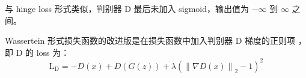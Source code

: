 与 hinge loss 形式类似，判别器 D 最后未加入 sigmoid，输出值为 $-\infty$ 到 $\infty$ 之间。

Wassertein 形式损失函数的改进版是在损失函数中加入判别器 D 梯度的正则项 ，
即 D 的 loss 为：
\begin{equation}
  \label{equ:WGAN-GP-loss}
  \mathrm{L}_{\mathrm{D}} = -D(x) + D(G(z)) + \lambda \left( \left\| \nabla D(x) \right\|_2 - 1 \right ) ^ 2
\end{equation}

